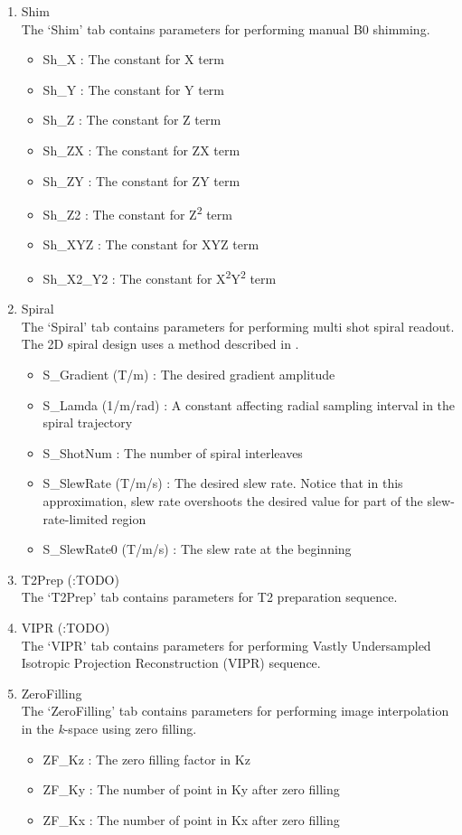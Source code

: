 \documentclass{book}%
\begin{document}
\begin{enumerate}
	\item Shim \\
	The `Shim' tab contains parameters for performing manual B0 shimming.
		\begin{itemize}
			\item Sh\_X : The constant for X term
			\item Sh\_Y : The constant for Y term
			\item Sh\_Z :  The constant for Z term
			\item Sh\_ZX : The constant for ZX term
			\item Sh\_ZY : The constant for ZY term
			\item Sh\_Z2 : The constant for Z\textsuperscript{2} term
			\item Sh\_XYZ : The constant for XYZ term
			\item Sh\_X2\_Y2 : The constant for X\textsuperscript{2}Y\textsuperscript{2} term
		\end{itemize}
	
	\item Spiral \\
	The `Spiral' tab contains parameters for performing multi shot spiral readout. The 2D spiral design uses a method described in \cite{Glover2005}.
		\begin{itemize}
			\item S\_Gradient (T/m) : The desired gradient amplitude
			\item S\_Lamda (1/m/rad) : A constant affecting radial sampling interval in the spiral trajectory
			\item S\_ShotNum : The number of spiral interleaves
			\item S\_SlewRate (T/m/s) : The desired slew rate. Notice that in this approximation, slew rate overshoots the desired value for part of the slew-rate-limited region
			\item S\_SlewRate0 (T/m/s) : The slew rate at the beginning
		\end{itemize}
	
  \item T2Prep (:TODO) \\
	The `T2Prep' tab contains parameters for T2 preparation sequence.
	
	\item VIPR (:TODO) \\
	The `VIPR' tab contains parameters for performing Vastly Undersampled Isotropic Projection Reconstruction (VIPR) sequence.
	
	\item ZeroFilling \\
	The `ZeroFilling' tab contains parameters for performing image interpolation in the \textit{k}-space using zero filling.
		\begin{itemize}
			\item ZF\_Kz : The zero filling factor in Kz
			\item ZF\_Ky : The number of point in Ky after zero filling
			\item ZF\_Kx : The number of point in Kx after zero filling
		\end{itemize}
	
\end{enumerate}
\end{document}
